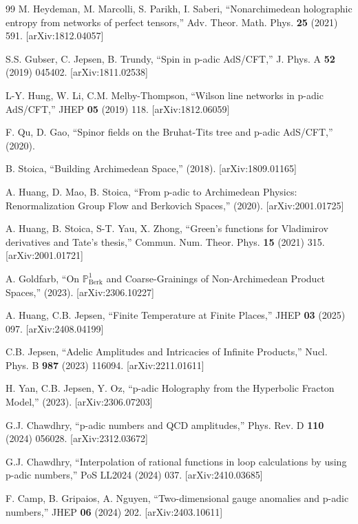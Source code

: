 \documentclass[11pt,a4paper]{article}
\begin{document}
\begin{thebibliography}{99}
 M. Heydeman, M. Marcolli, S. Parikh, I. Saberi, ``Nonarchimedean holographic entropy from networks of perfect tensors,'' Adv. Theor. Math. Phys. \textbf{25} (2021) 591. [arXiv:1812.04057]

 S.S. Gubser, C. Jepsen, B. Trundy, ``Spin in p-adic AdS/CFT,'' J. Phys. A \textbf{52} (2019) 045402. [arXiv:1811.02538]

 L-Y. Hung, W. Li, C.M. Melby-Thompson, ``Wilson line networks in p-adic AdS/CFT,'' JHEP \textbf{05} (2019) 118. [arXiv:1812.06059]

 F. Qu, D. Gao, ``Spinor fields on the Bruhat-Tits tree and p-adic AdS/CFT,'' (2020).


 B. Stoica, ``Building Archimedean Space,'' (2018). [arXiv:1809.01165]

 A. Huang, D. Mao, B. Stoica, ``From p-adic to Archimedean Physics: Renormalization Group Flow and Berkovich Spaces,'' (2020). [arXiv:2001.01725]

 A. Huang, B. Stoica, S-T. Yau, X. Zhong, ``Green's functions for Vladimirov derivatives and Tate's thesis,'' Commun. Num. Theor. Phys. \textbf{15} (2021) 315. [arXiv:2001.01721]

 A. Goldfarb, ``On $\mathbb{P}^1_{\text{Berk}}$ and Coarse-Grainings of Non-Archimedean Product Spaces,'' (2023). [arXiv:2306.10227]

 A. Huang, C.B. Jepsen, ``Finite Temperature at Finite Places,'' JHEP \textbf{03} (2025) 097. [arXiv:2408.04199]

 C.B. Jepsen, ``Adelic Amplitudes and Intricacies of Infinite Products,'' Nucl. Phys. B \textbf{987} (2023) 116094. [arXiv:2211.01611]


 H. Yan, C.B. Jepsen, Y. Oz, ``p-adic Holography from the Hyperbolic Fracton Model,'' (2023). [arXiv:2306.07203]

 G.J. Chawdhry, ``p-adic numbers and QCD amplitudes,'' Phys. Rev. D \textbf{110} (2024) 056028. [arXiv:2312.03672]

 G.J. Chawdhry, ``Interpolation of rational functions in loop calculations by using p-adic numbers,'' PoS LL2024 (2024) 037. [arXiv:2410.03685]

 F. Camp, B. Gripaios, A. Nguyen, ``Two-dimensional gauge anomalies and p-adic numbers,'' JHEP \textbf{06} (2024) 202. [arXiv:2403.10611]


\end{thebibliography}
\end{document}
